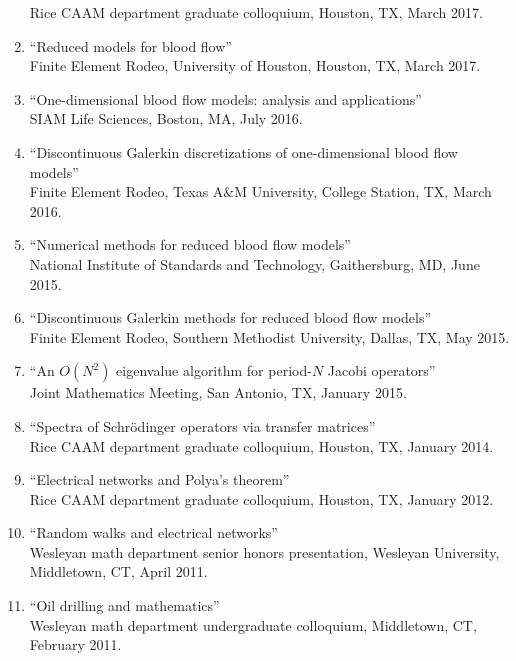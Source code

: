 \documentclass{article} %
\begin{document}
\begin{enumerate}
Rice CAAM department graduate colloquium, Houston, TX, March 2017.
\item ``Reduced models for blood flow'' \\
Finite Element Rodeo, University of Houston, Houston, TX, March 2017.
\item ``One-dimensional blood flow models: analysis and applications'' \\
SIAM Life Sciences, Boston, MA, July 2016.
\item ``Discontinuous Galerkin discretizations of one-dimensional blood flow models'' \\ 
Finite Element Rodeo, Texas A\&M University, College Station, TX, March 2016.
\item ``Numerical methods for reduced blood flow models'' \\
National Institute of Standards and Technology, Gaithersburg, MD, June 2015.
\item ``Discontinuous Galerkin methods for reduced blood flow models'' \\
Finite Element Rodeo, Southern Methodist University, Dallas, TX, May 2015.
\item ``An $O(N^2)$ eigenvalue algorithm for period-$N$ Jacobi operators'' \\
Joint Mathematics Meeting, San Antonio, TX, January 2015. 
\item ``Spectra of Schr\"odinger operators via transfer matrices'' \\
Rice CAAM department graduate colloquium, Houston, TX, January 2014.
\item ``Electrical networks and Polya's theorem'' \\
Rice CAAM department graduate colloquium, Houston, TX, January 2012.
\item ``Random walks and electrical networks'' \\
Wesleyan math department senior honors presentation, Wesleyan University, Middletown, CT, April 2011.
\item ``Oil drilling and mathematics'' \\ 
Wesleyan math department undergraduate colloquium, Middletown, CT, February 2011.
\end{enumerate}
\end{document}
